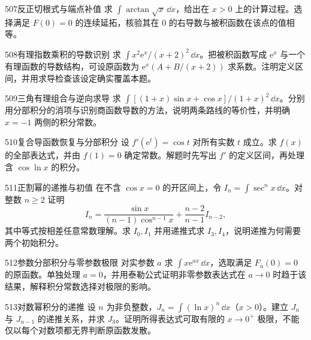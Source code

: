 \begin{exercise}{507}{反正切根式与端点补值}
求 $\int\arctan\sqrt x\,\dd x$，给出在 $x>0$ 上的计算过程。选择满足 $F(0)=0$ 的连续延拓，核验其在 $0$ 的右导数与被积函数在该点的值相等。
\end{exercise}
\begin{exercise}{508}{有理指数乘积的导数识别}
求 $\int x^2\mathrm e^x/(x+2)^2\,\dd x$。把被积函数写成 $\mathrm e^x$ 与一个有理函数的导数结构，可设原函数为 $\mathrm e^x(A+B/(x+2))$ 求系数。注明定义区间，并用求导检查该设定确实覆盖本题。
\end{exercise}
\begin{exercise}{509}{三角有理组合与逆向求导}
求 $\int[(1+x)\sin x+\cos x]/(1+x)^2\,\dd x$。分别用分部积分的消项与识别商函数导数的方法，说明两条路线的等价性，并明确 $x=-1$ 两侧的积分常数。
\end{exercise}
\begin{exercise}{510}{复合导函数恢复与分部积分}
设 $f'(\mathrm e^t)=\cos t$ 对所有实数 $t$ 成立。求 $f(x)$ 的全部表达式，并由 $f(1)=0$ 确定常数。解题时先写出 $f'$ 的定义区间，再处理含 $\cos\ln x$ 的积分。
\end{exercise}
\begin{exercise}{511}{正割幂的递推与初值}
在不含 $\cos x=0$ 的开区间上，令 $I_n=\int\sec^nx\,\dd x$。对整数 $n\ge2$ 证明
\[I_n=\frac{\sin x}{(n-1)\cos^{n-1}x}+\frac{n-2}{n-1}I_{n-2},\]
其中等式按相差任意常数理解。求 $I_0,I_1$ 并用递推式求 $I_3,I_4$，说明递推为何需要两个初始积分。
\end{exercise}
\begin{exercise}{512}{参数分部积分与零参数极限}
对实参数 $a$ 求 $\int x\mathrm e^{ax}\,\dd x$，选取满足 $F_a(0)=0$ 的原函数。单独处理 $a=0$，并用泰勒公式证明非零参数表达式在 $a\to0$ 时趋于该结果，解释积分常数选择对极限的影响。
\end{exercise}
\begin{exercise}{513}{对数幂积分的递推}
设 $n$ 为非负整数，$J_n=\int(\ln x)^n\,\dd x$（$x>0$）。建立 $J_n$ 与 $J_{n-1}$ 的递推关系，并求 $J_3$。证明所得表达式可取有限的 $x\to0^+$ 极限，不能仅以每个对数项都无界判断原函数发散。
\end{exercise}
